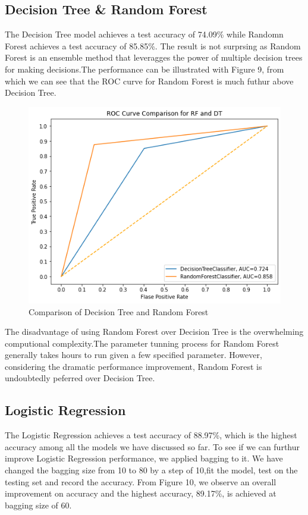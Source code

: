 \documentclass[10pt,twocolumn,letterpaper]{article}
\begin{document}
	\subsection{Decision Tree \& Random Forest}
	The Decision Tree model achieves a test accuracy of 74.09\% while Randomn Forest achieves a test accuracy of 85.85\%. The result is not surprsing as Random Forest is an ensemble method that leveragges the power of multiple decision trees for making decisions.The performance can be illustrated with Figure 9, from which we can see that the ROC curve for Random Forest is much futhur above Decision Tree. 
	\begin{figure}[H]
		\includegraphics[width=\columnwidth]{ROC_RF_DT}
		\caption{Comparison of Decision Tree and Random Forest}\label{ROC_RF_DT}
	\end{figure} 
	The disadvantage of using Random Forest over Decision Tree is the overwhelming computional complexity.The parameter tunning process for Random Forest generally takes hours to run given a few specified parameter. However, considering the dramatic performance improvement, Random Forest is undoubtedly peferred over Decision Tree.
	\subsection{Logistic Regression}
	The Logistic Regression achieves a test accuracy of 88.97\%, which is the highest accuracy among all the models we have discussed so far. To see if we can furthur improve Logistic Regression performance, we applied bagging to it. We have changed the bagging size from 10 to 80 by a step of 10,fit the model, test on the testing set and record the accuracy. From Figure 10, we observe an overall improvement on accuracy and the highest accuracy, 89.17\%, is achieved at bagging size of 60.
\end{document}
